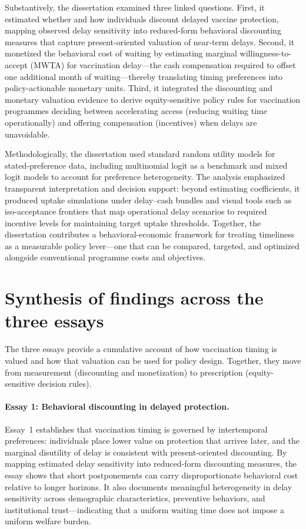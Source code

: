 \documentclass[doublespacing]{utdthesis}
\begin{document}
Substantively, the dissertation examined three linked questions. First, it estimated whether and how individuals discount delayed vaccine protection, mapping observed delay sensitivity into reduced-form behavioral discounting measures that capture present-oriented valuation of near-term delays. Second, it monetized the behavioral cost of waiting by estimating marginal willingness-to-accept (MWTA) for vaccination delay—the cash compensation required to offset one additional month of waiting—thereby translating timing preferences into policy-actionable monetary units. Third, it integrated the discounting and monetary valuation evidence to derive equity-sensitive policy rules for vaccination programmes deciding between accelerating access (reducing waiting time operationally) and offering compensation (incentives) when delays are unavoidable.

Methodologically, the dissertation used standard random utility models for stated-preference data, including multinomial logit as a benchmark and mixed logit models to account for preference heterogeneity. The analysis emphasized transparent interpretation and decision support: beyond estimating coefficients, it produced uptake simulations under delay--cash bundles and visual tools such as iso-acceptance frontiers that map operational delay scenarios to required incentive levels for maintaining target uptake thresholds. Together, the dissertation contributes a behavioral-economic framework for treating timeliness as a measurable policy lever—one that can be compared, targeted, and optimized alongside conventional programme costs and objectives.


\section{Synthesis of findings across the three essays}
\label{sec:dissertation_synthesis}

The three essays provide a cumulative account of how vaccination timing is valued and how that valuation can be used for policy design. Together, they move from measurement (discounting and monetization) to prescription (equity-sensitive decision rules).

\paragraph{Essay 1: Behavioral discounting in delayed protection.}
Essay~1 establishes that vaccination timing is governed by intertemporal preferences: individuals place lower value on protection that arrives later, and the marginal disutility of delay is consistent with present-oriented discounting. By mapping estimated delay sensitivity into reduced-form discounting measures, the essay shows that short postponements can carry disproportionate behavioral cost relative to longer horizons. It also documents meaningful heterogeneity in delay sensitivity across demographic characteristics, preventive behaviors, and institutional trust—indicating that a uniform waiting time does not impose a uniform welfare burden.
\end{document}
